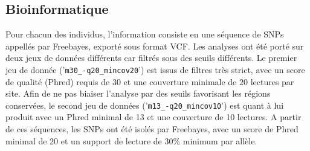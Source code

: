 
\subsection{Bioinformatique}

Pour chacun des individus, l'information consiste en une séquence de SNPs appellés par Freebayes, exporté sous format VCF. 
Les analyses ont été porté sur deux jeux de données différents car filtrés sous des seuils différents.
Le premier jeu de donnée ('\verb|m30_-q20_mincov20|') est issus de filtres très strict, avec un score de qualité (Phred) requis de 30 et une couverture minimale de 20 lectures par site. 
Afin de ne pas biaiser l'analyse par des seuils favorisant les régions conservées, le second jeu de données ('\verb|m13_-q20_mincov10|') est quant à lui produit avec un Phred minimal de 13 et une couverture de 10 lectures. 
A partir de ces séquences, les SNPs ont été isolés par Freebayes, avec un score de Phred minimal de 20 et un support de lecture de 30\% minimum par allèle.

